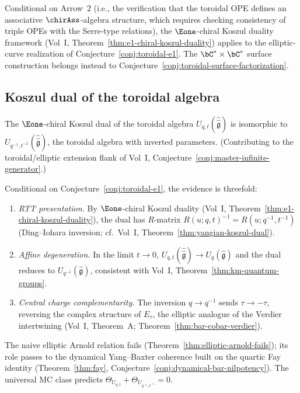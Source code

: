 \begin{remark}[Evidence]
Conditional on Arrow~2 (i.e., the verification that the toroidal OPE
defines an associative $\chirAss$-algebra structure, which requires
checking consistency of triple OPEs with the Serre-type relations), the
$\Eone$-chiral Koszul duality framework
(Vol~I, Theorem~\ref{thm:e1-chiral-koszul-duality}) applies to the
elliptic-curve realization of Conjecture~\ref{conj:toroidal-e1}. The
$\bC^* \times \bC^*$ surface construction belongs instead to
Conjecture~\ref{conj:toroidal-surface-factorization}.
\end{remark}


\subsection{Koszul dual of the toroidal algebra}

\begin{conjecture}
\label{conj:toroidal-koszul-dual}
\ClaimStatusConjectured
{}
The $\Eone$-chiral Koszul dual of the toroidal algebra
$U_{q,t}(\hat{\hat{\mathfrak{g}}})$ is isomorphic to
$U_{q^{-1},t^{-1}}(\hat{\hat{\mathfrak{g}}})$,
the toroidal algebra with inverted parameters.
(Contributing to the toroidal/elliptic extension flank of
Vol~I, Conjecture~\ref{conj:master-infinite-generator}.)
\end{conjecture}

\begin{remark}[Evidence]\label{rem:toroidal-koszul-evidence}
Conditional on Conjecture~\ref{conj:toroidal-e1}, the evidence is threefold:
\begin{enumerate}[label=\textup{(\roman*)}]
\item \emph{RTT presentation.} By $\Eone$-chiral Koszul duality (Vol~I, Theorem~\ref{thm:e1-chiral-koszul-duality}), the dual has $R$-matrix $R(u;q,t)^{-1} = R(u;q^{-1},t^{-1})$ (Ding--Iohara inversion; cf.\ Vol~I, Theorem~\ref{thm:yangian-koszul-dual}).
\item \emph{Affine degeneration.} In the limit $t \to 0$, $U_{q,t}(\hat{\hat{\mathfrak{g}}}) \to U_q(\hat{\mathfrak{g}})$ and the dual reduces to $U_{q^{-1}}(\hat{\mathfrak{g}})$, consistent with Vol~I, Theorem~\ref{thm:km-quantum-groups}.
\item \emph{Central charge complementarity.} The inversion $q \to q^{-1}$ sends $\tau \to -\tau$, reversing the complex structure of $E_\tau$, the elliptic analogue of the Verdier intertwining (Vol~I, Theorem~A; Theorem~\ref{thm:bar-cobar-verdier}).
\end{enumerate}
The naive elliptic Arnold relation fails (Theorem~\ref{thm:elliptic-arnold-fails}); its role passes to the dynamical Yang--Baxter coherence built on the quartic Fay identity (Theorem~\ref{thm:fay}, Conjecture~\ref{conj:dynamical-bar-nilpotency}). The universal MC class predicts $\Theta_{U_{q,t}} + \Theta_{U_{q^{-1},t^{-1}}} = 0$.
\end{remark}


